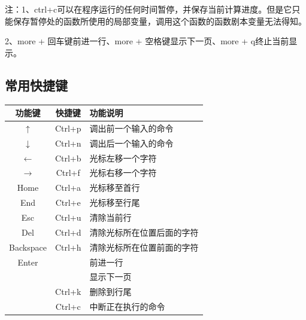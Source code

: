         \noindent 注：1、ctrl+c可以在程序运行的任何时间暂停，并保存当前计算进度。但是它只能保存暂停处的函数所使用的局部变量，调用这个函数的函数剧本变量无法得知。
        \par
        2、more + 回车键前进一行、more + 空格键显示下一页、more + q终止当前显示。
    \subsection{常用快捷键 }
        \begin{table}[H]
        \centering
          \begin{tabular}{ccl}%
            \toprule
            功能键&快捷键& 功能说明\\
            \midrule
            $\uparrow$ & Ctrl+p &调出前一个输入的命令\\
            $\downarrow$ & Ctrl+n&调出后一个输入的命令\\
            $\leftarrow$ & Ctrl+b&光标左移一个字符\\
            $\rightarrow$ & Ctrl+f& 光标右移一个字符\\
            Home &Ctrl+a & 光标移至首行\\
            End& Ctrl+e&光标移至行尾\\
            Esc & Ctrl+u&清除当前行\\
            Del & Ctrl+d&清除光标所在位置后面的字符\\
            Backspace & Ctrl+h & 清除光标所在位置前面的字符\\
            Enter & {} & 前进一行\\
            {} & {} & 显示下一页\\
            {}&Ctrl+k&删除到行尾\\
            {}&Ctrl+c&中断正在执行的命令\\
            \bottomrule
        \end{tabular}
        \end{table}
